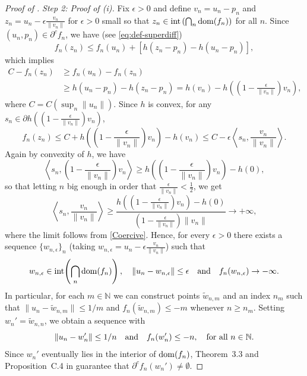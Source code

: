 \documentclass[11pt]{article}
\newcommand{\NN}{\mathbb{N}}
\theoremstyle{plain}
\theoremstyle{definition}\newtheorem{definition}[theorem]{Definition}
\theoremstyle{remark}
\begin{document}
\begin{proof}[Proof of ]
{\it Step 2: Proof of (i).} 
Fix $\epsilon>0$ and define $v_n= u_n-p_n $ and  $z_n= u_n- \epsilon \frac{v_n}{\|v_n\|} $ for $\epsilon>0$ small so that $ z_n \in  {\rm int}\left( \bigcap_n {\rm dom}(f_n) \right) $ for all $n$. Since $(u_n,p_n)\in\partial^c f_n  $, we have (see \eqref{eq:def-superdiff})
$$ f_n({z}_n)\leq f_n(u_n)+[h({z}_n-p_n)-h(u_n-p_n)], $$
which implies
\begin{align*}
  C-f_n(z_n)&\geq   f_n(u_n)-f_n({z}_n)\\
  &\geq h(u_n-p_n) -h({z}_n-p_n) = h(v_n) -h\left(\left(1-\frac{\epsilon}{\|v_n\|} \right) v_n \right) ,
\end{align*}
where $C=C(\sup_n\|u_n\|)$.  Since $h$ is convex, for any  $s_n\in \partial h\left(\left(1-\frac{\epsilon}{\|v_n\|} \right) v_n \right)$, 
$$ f_n(z_n) \leq C+ h\left(\left(1-\frac{\epsilon}{\|v_n\|} \right) v_n \right) -h(v_n) \leq C -\epsilon \left\langle s_n, \frac{v_n}{\|v_n\|} \right\rangle .$$
Again by convexity of $h$, we have 
$$ {\left\langle s_n, \left(1-\frac{\epsilon}{\|v_n\|} \right) v_n \right\rangle}   \geq  {h\left(\left(1-\frac{\epsilon}{\|v_n\|} \right) v_n \right) -h(0)},$$
so that letting $n$ big enough in order that $\frac{\epsilon}{\|v_n\|}<\frac{1}{2}$,  we get
$$ {\left\langle s_n, \frac{v_n}{\|v_n\|}\right\rangle}  \geq  \frac{h\left(\left(1-\frac{\epsilon}{\|v_n\|} \right) v_n \right) -h(0)}{\left(1-\frac{\epsilon}{\|v_n\|} \right) \|v_n\| }  \to +\infty ,  $$
where the limit follows from \ref{Coercive}. Hence,  for every $\epsilon>0$ there exists a sequence $\{w_{n,\epsilon}\}_n$ (taking $w_{n,\epsilon}= u_n- \epsilon \frac{v_n}{\|v_n\|} $)  such that 
$$ w_{n,\epsilon}\in {\rm int}\!\left(\bigcap_n {\rm dom}(f_n)\right),\quad   
\|u_n-w_{n,\epsilon}\|\leq \epsilon  \quad \text{and}\quad  f_n(w_{n,\epsilon})\to -\infty. $$
In particular, for each $m\in\mathbb{N}$ we can construct points 
$\tilde{w}_{n,m}$ and an index $n_m$ such that 
$\|u_n-\tilde{w}_{n,m}\|\leq 1/m$ and $f_n(\tilde{w}_{n,m})\leq -m$ whenever 
$n\geq n_m$. Setting $w_n'=\tilde{w}_{n,n}$, we obtain a sequence with 
\begin{equation}
    \label{eq:w.prima}
    \|u_n-w_n' \|\leq 1/n\quad {\rm and}\quad f_n(w_n')\leq -n,\quad \text{for all } n\in \NN. 
\end{equation}
 Since $w_n'$ eventually 
lies in the interior of ${\rm dom}(f_n)$, Theorem~3.3 and Proposition~C.4 
in \cite{GangboMcCann.96} guarantee that 
$\partial^c f_n(w_n')\neq \emptyset$.




\end{proof}
\end{document}
